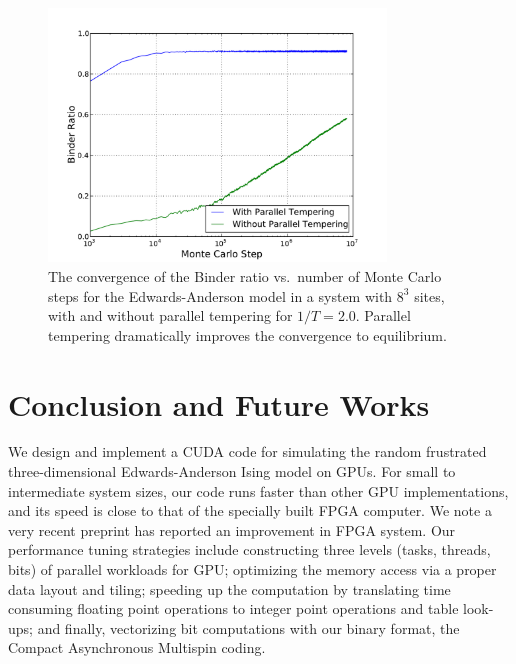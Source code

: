   \begin{figure}[ht!]
    \centering
    \includegraphics[width=0.8\textwidth]{img/qvst.pdf}
    \caption{The convergence of the Binder ratio vs.\ number of Monte Carlo steps for the Edwards-Anderson
      model in a system with $8^3$ sites, 
    with and without parallel tempering for  $1/T=2.0$.  Parallel tempering dramatically improves 
    the convergence to equilibrium.}
    \label{fig:qvst}
    \end{figure}








\section{Conclusion and Future Works}

We design and implement a CUDA code for simulating the random frustrated
three-dimensional Edwards-Anderson Ising model on GPUs. 
For small to intermediate system sizes, our code runs faster than other
GPU implementations, and its speed is close to that of the specially built FPGA
computer. We note a very recent	preprint has reported an improvement in FPGA system. \cite{Janus2-2013}
Our performance tuning strategies include constructing three
levels (tasks, threads, bits) of parallel workloads for GPU;
optimizing the memory access via a proper data layout and tiling; 
speeding up the computation by translating time consuming floating point
operations to integer point operations and table look-ups; and finally,
vectorizing bit computations with our binary format, the Compact Asynchronous Multispin coding.

